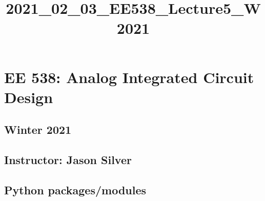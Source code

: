 \documentclass[11pt]{article}
\title{2021\_02\_03\_EE538\_Lecture5\_W2021}
\begin{document}
    
    \maketitle
    
    

    
    \hypertarget{ee-538-analog-integrated-circuit-design}{%
\section{EE 538: Analog Integrated Circuit
Design}\label{ee-538-analog-integrated-circuit-design}}

\hypertarget{winter-2021}{%
\subsection{Winter 2021}\label{winter-2021}}

\hypertarget{instructor-jason-silver}{%
\subsection{Instructor: Jason Silver}\label{instructor-jason-silver}}

    \hypertarget{python-packagesmodules}{%
\subsection{Python packages/modules}\label{python-packagesmodules}}
\end{document}
